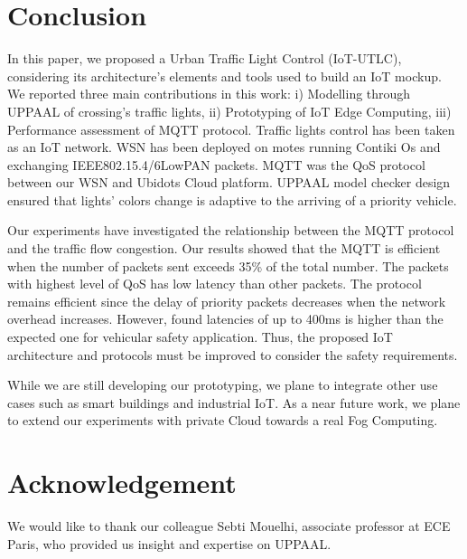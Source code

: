 \section{Conclusion} \label{Sec:Conclusion}

In this paper,
	we proposed a Urban Traffic Light Control (IoT-UTLC),
	considering its architecture’s elements and tools used to build an IoT mockup.
We reported three main contributions in this work:
	i) Modelling through UPPAAL of crossing's traffic lights,
	ii) Prototyping of IoT Edge Computing,
	iii) Performance assessment of MQTT protocol.
Traffic lights control has been taken as an IoT network.
WSN has been deployed on motes running Contiki Os and exchanging IEEE802.15.4/6LowPAN packets.
MQTT was the QoS protocol between our WSN and Ubidots Cloud platform.
UPPAAL model checker design ensured that lights' colors change is adaptive to the arriving of a priority vehicle.

Our experiments have investigated the relationship between the MQTT protocol and the traffic flow congestion.
Our results showed that the MQTT is efficient when the number of packets sent exceeds 35\% of the total number.
The packets with highest level of QoS has low latency than other packets.
The protocol remains efficient since the delay of priority packets decreases when the network overhead increases.
However,
	found latencies of up to 400ms is higher than the expected one for vehicular safety application.
Thus,
	the proposed IoT architecture and protocols must be improved to consider the safety requirements.

While we are still developing our prototyping,
	we plane to integrate other use cases such as smart buildings and industrial IoT.
As a near future work,
	we plane to extend our experiments with private Cloud towards a real Fog Computing.

\section*{Acknowledgement}

We would like to thank our colleague Sebti Mouelhi,
	associate professor at ECE Paris,
	who provided us insight and expertise on UPPAAL.
